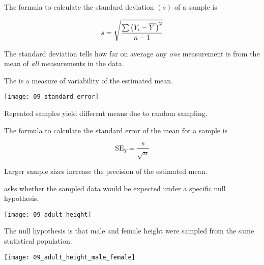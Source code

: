 \documentclass[t]{beamer}
\newcommand*\meanY{\overline{Y\kern1.67pt}\kern-1.67pt}
\newcommand*\meansubY{\overline{Y}}
\begin{document}
%
\begin{frame}[t]{The formula to calculate the standard deviation $(s)$ of a sample is}

{\Large
\[ s = \sqrt{\frac{\sum\left(Y_i - \meanY\kern1.67pt\right)^2}{n-1}} \]
}

\hangpara The standard deviation tells how far on average any
\emph{one} measurement is from the mean of \emph{all} measurements in 
the data. 

\end{frame}
%
\begin{frame}[t]{The  is a measure of variability of the estimated mean.}

	\vspace*{-\baselineskip}
	
	{\centering 
	\texttt{[image: 09\_standard\_error]} \par
	}
	
	\hangpara Repeated samples yield different means due to random sampling. 
	
\end{frame}
%
\begin{frame}[t]{The formula to calculate the standard error of the mean for a sample is}

{\Large
\[ \mathrm{SE}_{\meansubY} = \frac{s}{\sqrt{n}} \]
}

\hangpara Larger sample sizes increase the precision of the estimated mean.

\end{frame}
%
%
\begin{frame}[t]{ asks whether the sampled data would be expected under a specific null hypothesis.}

	\vspace{-\baselineskip}
	
	{\centering
	\texttt{[image: 09\_adult\_height]}\par
	}

\end{frame}
%
\begin{frame}[t]{The null hypothesis is that male and female height were sampled from the same statistical population.}

	\vspace{-\baselineskip}

	{\centering
	\texttt{[image: 09\_adult\_height\_male\_female]}\par
	}

\end{frame}
\end{document}
